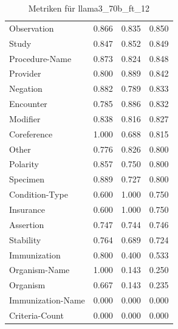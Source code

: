 \begin{table}[htbp]
\begin{tabular}{p{5cm}ccc}
Observation & 0.866 & 0.835 & 0.850 \\
Study & 0.847 & 0.852 & 0.849 \\
Procedure-Name & 0.873 & 0.824 & 0.848 \\
Provider & 0.800 & 0.889 & 0.842 \\
Negation & 0.882 & 0.789 & 0.833 \\
Encounter & 0.785 & 0.886 & 0.832 \\
Modifier & 0.838 & 0.816 & 0.827 \\
Coreference & 1.000 & 0.688 & 0.815 \\
Other & 0.776 & 0.826 & 0.800 \\
Polarity & 0.857 & 0.750 & 0.800 \\
Specimen & 0.889 & 0.727 & 0.800 \\
Condition-Type & 0.600 & 1.000 & 0.750 \\
Insurance & 0.600 & 1.000 & 0.750 \\
Assertion & 0.747 & 0.744 & 0.746 \\
Stability & 0.764 & 0.689 & 0.724 \\
Immunization & 0.800 & 0.400 & 0.533 \\
Organism-Name & 1.000 & 0.143 & 0.250 \\
Organism & 0.667 & 0.143 & 0.235 \\
Immunization-Name & 0.000 & 0.000 & 0.000 \\
Criteria-Count & 0.000 & 0.000 & 0.000 \\
\bottomrule
\end{tabular}
\caption{Metriken für llama3_70b_ft_12}
\label{tab:metrics_llama3_70b_ft_12}
\end{table}